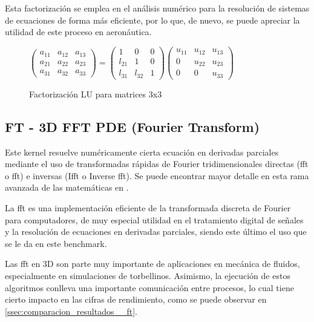 Esta factorización se emplea en el análisis numérico para la resolución de sistemas de ecuaciones de forma más eficiente, por lo que, de nuevo, se puede apreciar la utilidad de este proceso en aeronáutica.

\begin{figure}[h!]
  \vspace*{0.5cm}
  \centering
  
    $\begin{pmatrix}
    a_{11} & a_{12} & a_{13}\\
    a_{21} & a_{22} & a_{23}\\
    a_{31} & a_{32} & a_{33}
    \end{pmatrix}
    =
    \begin{pmatrix}
    1      & 0      & 0\\
    l_{21} & 1      & 0\\
    l_{31} & l_{32} & 1
    \end{pmatrix}
    \begin{pmatrix}
    u_{11} & u_{12} & u_{13}\\
    0      & u_{22} & u_{23}\\
    0      & 0      & u_{33}
    \end{pmatrix}
    $

  \caption{Factorización LU para matrices 3x3}
  \label{fig:factorizacion_lu}
\end{figure}

\subsection{FT - 3D FFT PDE (Fourier Transform)}
Este kernel resuelve numéricamente cierta ecuación en derivadas parciales mediante el uso de transformadas rápidas de Fourier tridimensionales directas (\acrshort{fft} o \acrlong{fft}) e inversas (I\acrshort{fft} o Inverse \acrshort{fft}). Se puede encontrar mayor detalle en esta rama avanzada de las matemáticas en \cite[2.2.4]{benchmarks1994technical}.

La \acrshort{fft} es una implementación eficiente de la transformada discreta de Fourier para computadores, de muy especial utilidad en el tratamiento digital de señales y la resolución de ecuaciones en derivadas parciales, siendo este último el uso que se le da en este benchmark. 

Las \acrshort{fft} en 3D son parte muy importante de aplicaciones en mecánica de fluidos, especialmente en simulaciones de torbellinos. Asimismo, la ejecución de estos algoritmos conlleva una importante comunicación entre procesos, lo cual tiene cierto impacto en las cifras de rendimiento, como se puede observar en \ref{ssec:comparacion_resultados__ft}.

